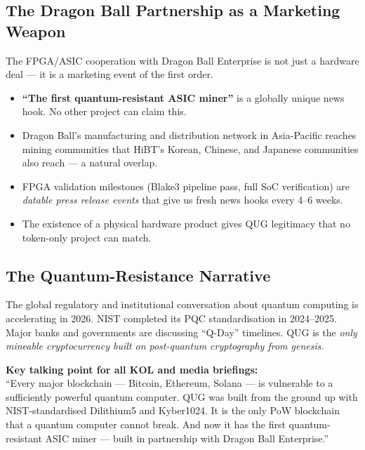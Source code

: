\documentclass[11pt,a4paper]{article}
\begin{document}
\subsection{The Dragon Ball Partnership as a Marketing Weapon}

The FPGA/ASIC cooperation with Dragon Ball Enterprise is not just a hardware deal — it is a marketing event of the first order.

\begin{itemize}[leftmargin=1.5em]
  \item \textbf{``The first quantum-resistant ASIC miner''} is a globally unique news hook. No other project can claim this.
  \item Dragon Ball's manufacturing and distribution network in Asia-Pacific reaches mining communities that HiBT's Korean, Chinese, and Japanese communities also reach — a natural overlap.
  \item FPGA validation milestones (Blake3 pipeline pass, full SoC verification) are \emph{datable press release events} that give us fresh news hooks every 4--6 weeks.
  \item The existence of a physical hardware product gives QUG legitimacy that no token-only project can match.
\end{itemize}

\subsection{The Quantum-Resistance Narrative}

The global regulatory and institutional conversation about quantum computing is accelerating in 2026. NIST completed its PQC standardisation in 2024--2025. Major banks and governments are discussing ``Q-Day'' timelines. QUG is the \emph{only mineable cryptocurrency built on post-quantum cryptography from genesis}.

\begin{graybox}
\textbf{Key talking point for all KOL and media briefings:}\\
``Every major blockchain — Bitcoin, Ethereum, Solana — is vulnerable to a sufficiently powerful quantum computer. QUG was built from the ground up with NIST-standardised Dilithium5 and Kyber1024. It is the only PoW blockchain that a quantum computer cannot break. And now it has the first quantum-resistant ASIC miner — built in partnership with Dragon Ball Enterprise.''
\end{graybox}

\end{document}
